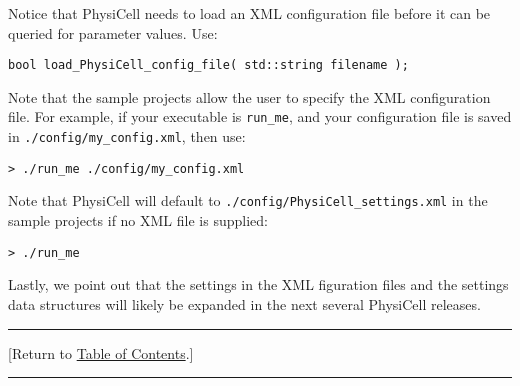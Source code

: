 \documentclass[12pt]{article}
\renewcommand{\v}{\verb}
\newcommand{\TOClink}{\begin{center}\hrule\vskip-5pt\phantom{.}\hfill[Return to \hyperlink{TOC}{Table of Contents}.]\hfill\phantom{.}\vskip3pt\hrule\end{center}}
\begin{document}
Notice that PhysiCell needs to load an XML configuration file 
before it can be queried for parameter values. Use: 

\v|bool load_PhysiCell_config_file( std::string filename );| 

Note that the sample projects allow the user to specify 
the XML configuration file. For example, if your executable is 
\v|run_me|, and your configuration file is saved in 
\v|./config/my_config.xml|, then use: 

\v|> ./run_me ./config/my_config.xml|

Note that PhysiCell will default to \v|./config/PhysiCell_settings.xml| 
in the sample projects if no XML file is supplied: 

\v|> ./run_me |



Lastly, we point out that the settings in the XML figuration files and the settings 
data structures will likely be expanded in the next several PhysiCell releases. 

\TOClink 
\end{document}
